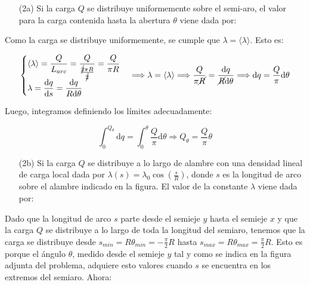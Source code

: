 \documentclass[a4paper,10pt]{article}
\begin{document}
\begin{itemize}
    \item[(2a)] Si la carga $Q$ se distribuye uniformemente sobre el semi-aro, el valor
    para la carga contenida hasta la abertura $\theta$ viene dada por: 
\end{itemize}

Como la carga se distribuye uniformemente, se cumple que $\lambda=\langle\lambda\rangle$.
Esto es:

\begin{equation*}
    \begin{cases}
        \langle\lambda\rangle=\dfrac{Q}{L_{arc}}=\dfrac{Q}{\frac{\cancel{2}\pi R}{\cancel{2}}}
        =\dfrac{Q}{\pi R}\\
        \lambda=\dfrac{\mathrm{d}q}{\mathrm{d}s}=\dfrac{\mathrm{d}q}{R\mathrm{d}\theta}
    \end{cases}
    \Longrightarrow \lambda=\langle\lambda\rangle \Longrightarrow
    \dfrac{Q}{\pi \cancel{R}}=\dfrac{\mathrm{d}q}{\cancel{R}\mathrm{d}\theta}
    \Longrightarrow \mathrm{d}q=\frac{Q}{\pi}\mathrm{d}\theta
\end{equation*}

Luego, integramos definiendo los l\'imites adecuadamente:

\begin{equation*}
    \int_{0}^{Q_{\theta}} \mathrm{d}q = \int_{0}^{\theta} \frac{Q}{\pi}\mathrm{d}\theta
    \Longrightarrow\boxed{Q_{\theta}=\frac{Q}{\pi}\theta}
\end{equation*}

\begin{itemize}
    \item[(2b)] Si la carga $Q$ se distribuye a lo largo de alambre con una densidad
    lineal de carga local dada por $\lambda(s)=\lambda_{0}\cos\left(\frac{s}{R}\right)$, donde
    $s$ es la longitud de arco sobre el alambre indicado en la figura. El valor
    de la constante $\lambda$ viene dada por:
\end{itemize}

Dado que la longitud de arco $s$ parte desde el semieje $y$ hasta el semieje $x$ y que
la carga $Q$ se distribuye a lo largo de toda la longitud del semiaro, tenemos que la
carga se distribuye desde $s_{min}=R\theta_{min}=-\frac{\pi}{2}R$ hasta
$s_{max}=R\theta_{max}=\frac{\pi}{2}R$. Esto es porque el \'angulo $\theta$, medido
desde el semieje $y$ tal y como se indica en la figura adjunta del problema, adquiere
esto valores cuando $s$ se encuentra en los extremos del semiaro. Ahora: 
\end{document}
